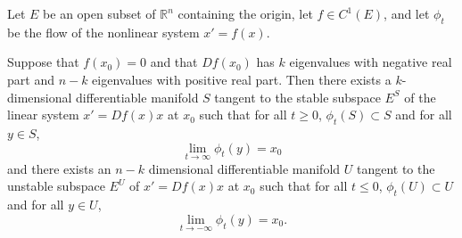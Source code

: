 \documentclass[12pt]{article}
\begin{document}
Let $E$ be an open subset of $\mathbb{R}^n$ containing the origin, let 
$f\in C^1(E)$, and let $\phi_t$ be the flow of the nonlinear system $x'=f(x)$.

Suppose that $f(x_0)=0$ and that $Df(x_0)$ has $k$ eigenvalues with negative real part and $n-k$ eigenvalues with positive real part. Then there exists a $k$-dimensional differentiable manifold $S$ tangent to the stable subspace $E^S$ of the linear system $x'=Df(x)x$ at $x_0$ such that for all $t\geq 0$, $\phi_t(S)\subset S$ and for all $y\in S$,
\[
\lim_{t\to\infty}\phi_t(y)=x_0
\]
and there exists an $n-k$ dimensional differentiable manifold $U$ tangent to the unstable subspace $E^U$ of $x'=Df(x)x$ at $x_0$ such that for all 
$t\leq 0$, $\phi_t(U)\subset U$ and for all $y\in U$,
\[
\lim_{t\to -\infty}\phi_t(y)=x_0.
\]
\end{document}
